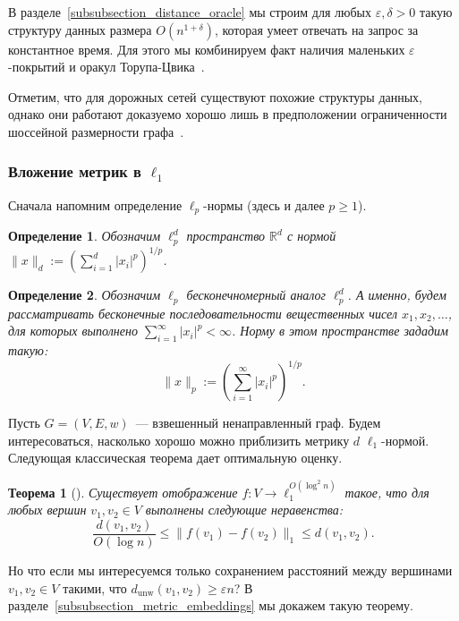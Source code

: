 \documentclass[12pt]{article}
\newcommand{\eps}{\varepsilon}
\newcommand{\dunw}{d_{\mathrm{unw}}}
\newcommand{\abs}[1]{\left|#1\right|}
\newcommand{\Rbb}{\mathbb{R}}
\newtheorem{definition}{Определение}
\newtheorem{theorem}{Теорема}
\begin{document}
    В разделе~\ref{subsubsection_distance_oracle} мы строим для любых $\eps, \delta > 0$
    такую структуру данных размера $O(n^{1 + \delta})$, которая умеет отвечать на запрос за константное время.
    Для этого мы комбинируем факт наличия маленьких $\eps$-покрытий и оракул Торупа-Цвика~\cite{TZ05}.

    Отметим, что для дорожных сетей существуют похожие структуры данных, однако они работают доказуемо хорошо лишь в предположении
    ограниченности шоссейной размерности графа~\cite{BFMSS07, AFGW10}.

    \subsubsection{Вложение метрик в $\ell_1$}

    Сначала напомним определение $\ell_p$-нормы (здесь и далее $p \geq 1$).

    \begin{definition}
        Обозначим $\ell_p^d$ пространство $\Rbb^d$ с нормой $\|x\|_d := \left(\sum_{i=1}^d \abs{x_i}^p\right)^{1/p}$.
    \end{definition}
    \begin{definition}
        Обозначим $\ell_p$ бесконечномерный аналог $\ell_p^d$. А именно, будем рассматривать бесконечные последовательности вещественных чисел
        $x_1, x_2, \ldots$, для которых выполнено $\sum_{i=1}^{\infty} \abs{x_i}^p < \infty$.
        Норму в этом пространстве зададим такую:
        $$
            \|x\|_p := \left(\sum_{i=1}^{\infty} \abs{x_i}^p \right)^{1/p}. 
        $$
    \end{definition}

    Пусть $G = (V, E, w)$~--- взвешенный ненаправленный граф.
    Будем интересоваться, насколько хорошо можно приблизить метрику $d$ $\ell_1$-нормой.
    Следующая классическая теорема дает оптимальную оценку.
    \begin{theorem}[\cite{B85}]
        \label{theorem_bourgain}
        Существует отображение $f \colon V \to \ell_1^{O(\log^2 n)}$ такое, что для любых вершин 
        $v_1, v_2 \in V$ выполнены следующие неравенства:
        $$
            \frac{d(v_1, v_2)}{O(\log n)} \leq \|f(v_1) - f(v_2)\|_1 \leq d(v_1, v_2).
        $$
    \end{theorem}

    Но что если мы интересуемся только сохранением расстояний между вершинами $v_1, v_2 \in V$ такими, что
    $\dunw(v_1, v_2) \geq \eps n$? В разделе~\ref{subsubsection_metric_embeddings} мы докажем такую теорему.
\end{document}

